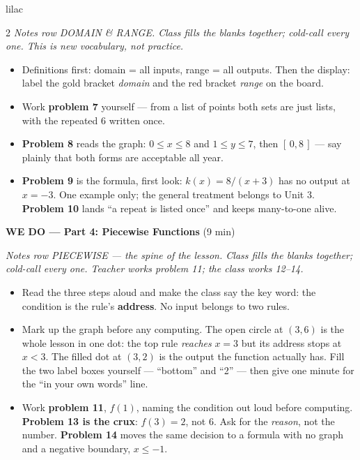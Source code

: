 \documentclass[10pt]{article}
\begin{document}
\begin{skillbox}{lilac}
\begin{multicols}{2}
\textit{Notes row DOMAIN \& RANGE. Class fills the blanks together; cold-call
every one. This is new vocabulary, not practice.}
\begin{itemize}
  \item Definitions first: domain = all inputs, range = all outputs. Then the
        display: label the gold bracket \textit{domain} and the red bracket
        \textit{range} on the board.
  \item Work \textbf{problem 7} yourself --- from a list of points both sets are
        just lists, with the repeated 6 written once.
  \item \textbf{Problem 8} reads the graph: $0 \le x \le 8$ and $1 \le y \le 7$,
        then $[\,0, 8\,]$ --- say plainly that both forms are acceptable all year.
  \item \textbf{Problem 9} is the formula, first look: $k(x) = 8/(x+3)$ has no
        output at $x = -3$. One example only; the general treatment belongs to
        Unit 3. \textbf{Problem 10} lands ``a repeat is listed once'' and keeps
        many-to-one alive.
\end{itemize}

\textbf{WE DO --- Part 4: Piecewise Functions} (9 min)

\textit{Notes row PIECEWISE --- the spine of the lesson. Class fills the blanks
together; cold-call every one. Teacher works problem 11; the class works 12--14.}
\begin{itemize}
  \item Read the three steps aloud and make the class say the key word:
        the condition is the rule's \textbf{address}. No input belongs to two
        rules.
  \item Mark up the graph before any computing. The open circle at $(3,6)$ is the
        whole lesson in one dot: the top rule \textit{reaches} $x = 3$ but its
        address stops at $x < 3$. The filled dot at $(3,2)$ is the output the
        function actually has. Fill the two label boxes yourself --- ``bottom''
        and ``2'' --- then give one minute for the ``in your own words'' line.
  \item Work \textbf{problem 11}, $f(1)$, naming the condition out loud before
        computing. \textbf{Problem 13 is the crux}: $f(3) = 2$, not 6. Ask for the
        \textit{reason}, not the number. \textbf{Problem 14} moves the same
        decision to a formula with no graph and a negative boundary, $x \le -1$.
\end{itemize}


\end{multicols}
\end{skillbox}
\end{document}
